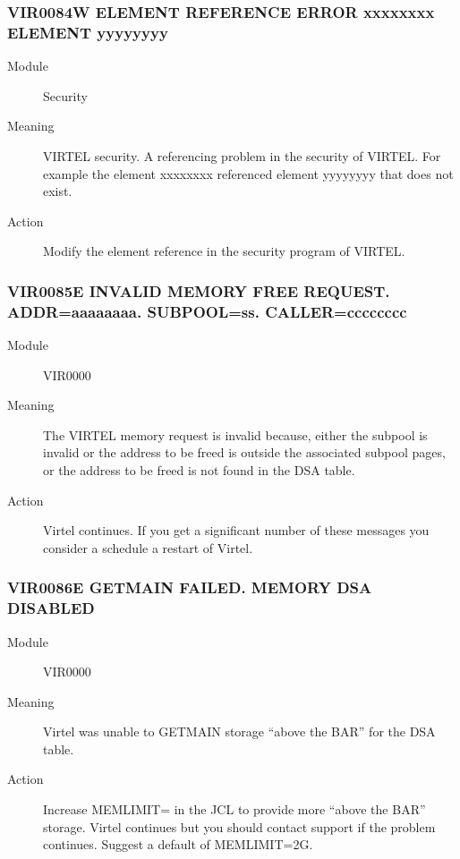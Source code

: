 \documentclass[letterpaper,10pt,english]{sphinxmanual}
\begin{document}
\subsubsection{VIR0084W ELEMENT REFERENCE ERROR xxxxxxxx ELEMENT yyyyyyyy}
\label{\detokenize{messages:vir0084w-element-reference-error-xxxxxxxx-element-yyyyyyyy}}\begin{description}
\item[{Module}] \leavevmode
Security

\item[{Meaning}] \leavevmode
VIRTEL security. A referencing problem in the security of VIRTEL. For example the element xxxxxxxx referenced element yyyyyyyy that does not exist.

\item[{Action}] \leavevmode
Modify the element reference in the security program of VIRTEL.

\end{description}


\subsubsection{VIR0085E INVALID MEMORY FREE REQUEST. ADDR=aaaaaaaa. SUBPOOL=ss. CALLER=cccccccc}
\label{\detokenize{messages:vir0085e-invalid-memory-free-request-addr-aaaaaaaa-subpool-ss-caller-cccccccc}}\begin{description}
\item[{Module}] \leavevmode
VIR0000

\item[{Meaning}] \leavevmode
The VIRTEL memory request is invalid because, either the subpool is invalid or the address to be freed is outside the associated subpool pages, or the address to be freed is not found in the DSA table.

\item[{Action}] \leavevmode
Virtel continues. If you get a significant number of these messages you consider a schedule a restart of Virtel.

\end{description}


\subsubsection{VIR0086E GETMAIN FAILED. MEMORY DSA DISABLED}
\label{\detokenize{messages:vir0086e-getmain-failed-memory-dsa-disabled}}\begin{description}
\item[{Module}] \leavevmode
VIR0000

\item[{Meaning}] \leavevmode
Virtel was unable to GETMAIN storage “above the BAR” for the DSA table.

\item[{Action}] \leavevmode
Increase MEMLIMIT= in the JCL to provide more “above the BAR” storage. Virtel continues but you should contact support if the problem continues. Suggest a default of MEMLIMIT=2G.

\end{description}
\end{document}
